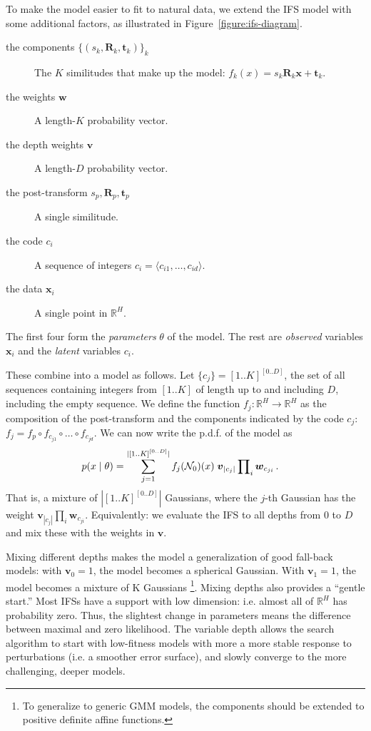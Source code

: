 \documentclass[reprint,amsmath,amssymb,aps,prl]{revtex4-1}
\newcommand{\p}{\mbox{\,.}}
\newcommand{\R}{\mathbb{R}}
\newcommand{\cN}{{\cal N}}
\newcommand{\bx}{\boldsymbol x}
\newcommand{\bt}{\boldsymbol t}
\newcommand{\bR}{\boldsymbol R}
\newcommand{\bw}{\boldsymbol w}
\newcommand{\bv}{\boldsymbol v}
\begin{document}
To make the model easier to fit to natural data, we extend the IFS model with some additional factors, as illustrated in Figure~\ref{figure:ifs-diagram}.
\begin{description}
\item[the components $\{(s_k, \bR_k, \bt_k)\}_k$] The $K$ similitudes that make up the model: $f_k(x) = s_k\bR_k\bx + \bt_k$.
\item[the weights $\bw$] A length-$K$ probability vector. 
\item[the depth weights $\bv$] A length-$D$ probability vector.
\item[the post-transform $s_p, \bR_p, \bt_p$] A single similitude.
\item[the code $c_i$] A sequence of integers $c_i = \langle c_{i1}, \ldots, c_{id} \rangle$.
\item[the data $\bx_i$] A single point in $\R^H$.
\end{description}
The first four form the \emph{parameters} $\theta$ of the model. The rest are \emph{observed} variables $\bx_i$ and the \emph{latent} variables $c_i$.  

These combine into a model as follows. Let $\{c_j\} = [1 .. K]^{[0 .. D]}$, the set of all sequences containing integers from $[1 .. K]$ of length up to and including $D$, including the empty sequence. We define the function $f_j:\R^H \to \R^H$ as the composition of the post-transform and the components indicated by the code $c_j$:$f_j = f_p \circ f_{c_{j1}} \circ \ldots \circ f_{c_{jd}}$. We can now write the p.d.f. of the model as
\begin{align*}
p(x\mid \theta) &= \sum_{j=1}^{|[1 .. K]^{[0 .. D]}|} f_j(\cN_0)(x)\; \bv_{|c_j|} \prod\nolimits_i \bw_{c_{ji}} \p
\end{align*}
That is, a mixture of $|[1 .. K]^{[0 .. D]}|$ Gaussians, where the $j$-th Gaussian has the weight $\bv_{|c_j|} \prod_i \bw_{c_{ji}}$. Equivalently: we evaluate the IFS to all depths from $0$ to $D$ and mix these with the weights in $\bv$.

Mixing different depths makes the model a generalization of good fall-back models: with $\bv_0 = 1$, the model becomes a spherical Gaussian. With $\bv_1 = 1$, the model becomes a mixture of K Gaussians \footnote{To generalize to generic GMM models, the components should be extended to positive definite affine functions.}. Mixing depths also provides a ``gentle start.'' Most IFSs have a support with low dimension: i.e. almost all of $\R^H$ has probability zero. Thus, the slightest change in parameters means the difference between maximal and zero likelihood. The variable depth allows the search algorithm to start with low-fitness models with more a more stable response to perturbations (i.e. a smoother error surface), and slowly converge to the more challenging, deeper models.
\end{document}
